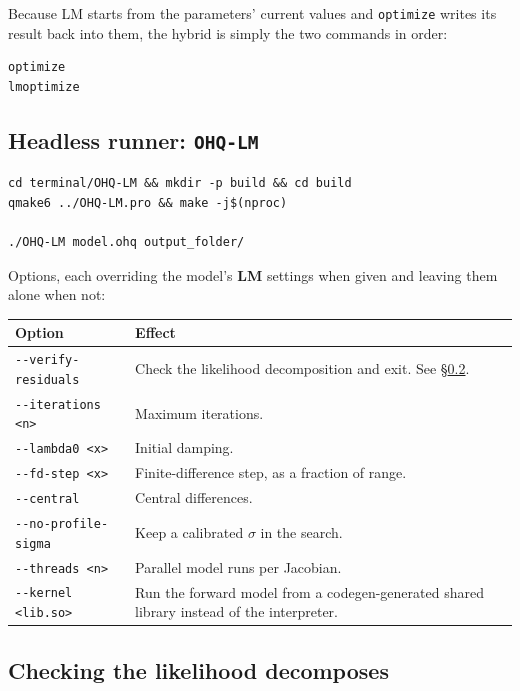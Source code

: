\documentclass[11pt,a4paper]{article}
\newcommand{\code}[1]{\texttt{\small #1}}
\begin{document}
\noindent Because LM starts from the parameters' current values and
\code{optimize} writes its result back into them, the hybrid is simply the two
commands in order:

\begin{lstlisting}
optimize
lmoptimize
\end{lstlisting}

\subsection{Headless runner: \code{OHQ-LM}}

\begin{lstlisting}
cd terminal/OHQ-LM && mkdir -p build && cd build
qmake6 ../OHQ-LM.pro && make -j$(nproc)

./OHQ-LM model.ohq output_folder/
\end{lstlisting}

\noindent Options, each overriding the model's \textbf{LM} settings when given
and leaving them alone when not:

\begin{longtable}{@{}L{0.34\textwidth}L{0.62\textwidth}@{}}
\toprule
\textbf{Option} & \textbf{Effect} \\
\midrule
\endhead
\code{-{}-verify-residuals} & Check the likelihood decomposition and exit. See
  \S\ref{sec:verify}. \\
\code{-{}-iterations <n>}   & Maximum iterations. \\
\code{-{}-lambda0 <x>}      & Initial damping. \\
\code{-{}-fd-step <x>}      & Finite-difference step, as a fraction of range. \\
\code{-{}-central}          & Central differences. \\
\code{-{}-no-profile-sigma} & Keep a calibrated $\sigma$ in the search. \\
\code{-{}-threads <n>}      & Parallel model runs per Jacobian. \\
\code{-{}-kernel <lib.so>}  & Run the forward model from a codegen-generated
  shared library instead of the interpreter. \\
\bottomrule
\end{longtable}

\subsection{Checking the likelihood decomposes}\label{sec:verify}
\end{document}
